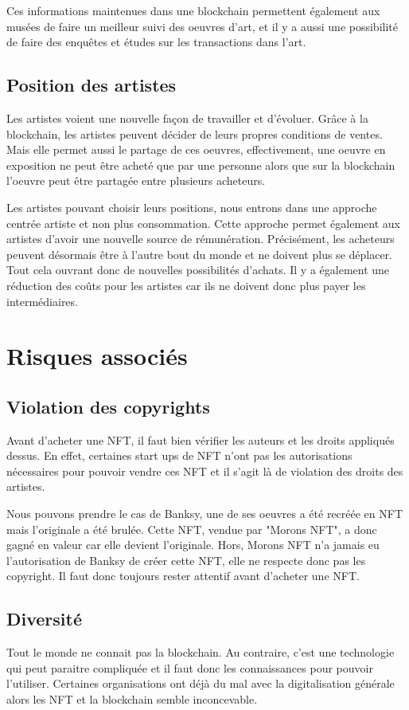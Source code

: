 \documentclass[11pt]{article}
\begin{document}
Ces informations maintenues dans une blockchain permettent également aux musées de faire un meilleur suivi des oeuvres d'art, et il y a aussi une possibilité de faire des enquêtes et études sur les transactions dans l'art. \cite{jung_current_2022} 

\subsection{Position des artistes} %
Les artistes voient une nouvelle façon de travailler et d'évoluer. Grâce à la blockchain, les artistes peuvent décider de leurs propres conditions de ventes. Mais elle permet aussi le partage de ces oeuvres, effectivement, une oeuvre en exposition ne peut être acheté que par une personne alors que sur la blockchain l'oeuvre peut être partagée entre plusieurs acheteurs.

Les artistes pouvant choisir leurs positions, nous entrons dans une approche centrée artiste et non plus consommation. Cette approche permet  également aux artistes d'avoir une nouvelle source de rémunération. Précisément, les acheteurs peuvent désormais être à l'autre bout du monde et ne doivent plus se déplacer. Tout cela ouvrant donc de nouvelles possibilités d'achats. \cite{whitaker_art_2019}
Il y a également une réduction des coûts pour les artistes car ils ne doivent donc plus payer les intermédiaires.

\section{Risques associés} %
\subsection{Violation des copyrights} %
Avant d'acheter une NFT, il faut bien vérifier les auteurs et les droits appliqués dessus. En effet, certaines start ups de NFT n'ont pas les autorisations nécessaires pour pouvoir vendre ces NFT et il s'agit là de violation des droits des artistes. 

Nous pouvons prendre le cas de Banksy, une de ses oeuvres a été recréée en NFT mais l'originale a été brulée. Cette NFT, vendue par "Morons NFT", a donc gagné en valeur car elle devient l'originale. Hors, Morons NFT n'a jamais eu l'autorisation de Banksy de créer cette NFT, elle ne respecte donc pas les copyright. Il faut donc toujours rester attentif avant d'acheter une NFT. \cite{lydiate_crypto_2021}
\subsection{Diversité} %
Tout le monde ne connait pas la blockchain. Au contraire, c'est une technologie qui peut paraitre compliquée et il faut donc les connaissances pour pouvoir l'utiliser. Certaines organisations ont déjà du mal avec la digitalisation générale alors les NFT et la blockchain semble inconcevable. \cite{abbate_blockchain_2022}
\end{document}
